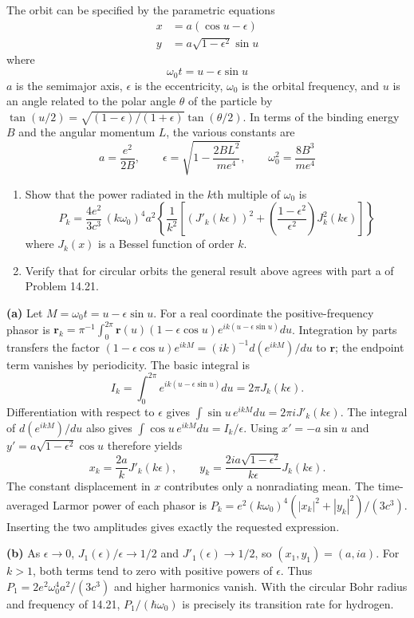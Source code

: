 The orbit can be specified by the parametric equations
\begin{align*}
x&=a(\cos u-\epsilon)\\
y&=a\sqrt{1-\epsilon^{2}}\sin u
\end{align*}
where
\[
\omega_{0}t=u-\epsilon\sin u
\]
$a$ is the semimajor axis, $\epsilon$ is the eccentricity, $\omega_{0}$ is the orbital frequency, and $u$ is an angle related to the polar angle $\theta$ of the particle by $\tan(u/2)=\sqrt{(1-\epsilon)/(1+\epsilon)}\tan(\theta/2)$. In terms of the binding energy $B$ and the angular momentum $L$, the various constants are
\[
a=\frac{e^{2}}{2B},\qquad\epsilon=\sqrt{1-\frac{2BL^{2}}{me^{4}}},\qquad\omega_{0}^{2}=\frac{8B^{3}}{me^{4}}
\]
\begin{enumerate}
\item[(a)] Show that the power radiated in the $k$th multiple of $\omega_{0}$ is
\[
P_{k}=\frac{4e^{2}}{3c^{3}}\,(k\omega_{0})^{4}a^{2}\!\left\{\frac{1}{k^{2}}\left[(J'_{k}(k\epsilon))^{2}+\left(\frac{1-\epsilon^{2}}{\epsilon^{2}}\right)\!J_{k}^{2}(k\epsilon)\right]\right\}
\]
where $J_{k}(x)$ is a Bessel function of order $k$.
\item[(b)] Verify that for circular orbits the general result above agrees with part a of Problem 14.21.
\end{enumerate}
\solution

\textbf{(a)} Let $M=\omega_0t=u-\epsilon\sin u$.
For a real coordinate the positive-frequency phasor is
$\mathbf r_k=\pi^{-1}\int_0^{2\pi}\mathbf r(u)
(1-\epsilon\cos u)e^{ik(u-\epsilon\sin u)}du$.
Integration by parts transfers the factor
$(1-\epsilon\cos u)e^{ikM}=(ik)^{-1}d(e^{ikM})/du$ to $\mathbf r$;
the endpoint term vanishes by periodicity.
The basic integral is
\[
I_k=\int_0^{2\pi}e^{ik(u-\epsilon\sin u)}du=2\pi J_k(k\epsilon).
\]
Differentiation with respect to $\epsilon$ gives
$\int\sin u\,e^{ikM}du=2\pi iJ'_k(k\epsilon)$.
The integral of $d(e^{ikM})/du$ also gives
$\int\cos u\,e^{ikM}du=I_k/\epsilon$.
Using $x'=-a\sin u$ and $y'=a\sqrt{1-\epsilon^2}\cos u$ therefore yields
\[
\boxed{x_k=\frac{2a}{k}J'_k(k\epsilon),\qquad
 y_k=\frac{2ia\sqrt{1-\epsilon^2}}{k\epsilon}J_k(k\epsilon).}
\]
The constant displacement in $x$ contributes only a nonradiating mean.
The time-averaged Larmor power of each phasor is
$P_k=e^2(k\omega_0)^4(|x_k|^2+|y_k|^2)/(3c^3)$.
Inserting the two amplitudes gives exactly the requested expression.

\textbf{(b)} As $\epsilon\to0$, $J_1(\epsilon)/\epsilon\to1/2$ and
$J'_1(\epsilon)\to1/2$, so $(x_1,y_1)=(a,ia)$.
For $k>1$, both terms tend to zero with positive powers of $\epsilon$.
Thus $P_1=2e^2\omega_0^4a^2/(3c^3)$ and higher harmonics vanish.
With the circular Bohr radius and frequency of 14.21,
$P_1/(\hbar\omega_0)$ is precisely its transition rate for hydrogen.

